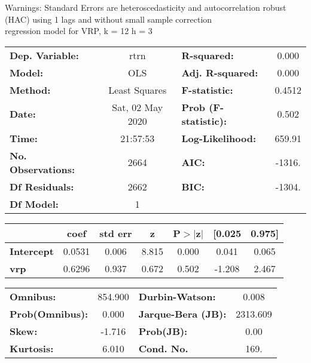 Warnings: \newline
 [1] Standard Errors are heteroscedasticity and autocorrelation robust (HAC) using 1 lags and without small sample correction\\ 

regression model for VRP, k = 12 h = 3\begin{center}
\begin{tabular}{lclc}
\toprule
\textbf{Dep. Variable:}    &       rtrn       & \textbf{  R-squared:         } &     0.000   \\
\textbf{Model:}            &       OLS        & \textbf{  Adj. R-squared:    } &     0.000   \\
\textbf{Method:}           &  Least Squares   & \textbf{  F-statistic:       } &    0.4512   \\
\textbf{Date:}             & Sat, 02 May 2020 & \textbf{  Prob (F-statistic):} &    0.502    \\
\textbf{Time:}             &     21:57:53     & \textbf{  Log-Likelihood:    } &    659.91   \\
\textbf{No. Observations:} &        2664      & \textbf{  AIC:               } &    -1316.   \\
\textbf{Df Residuals:}     &        2662      & \textbf{  BIC:               } &    -1304.   \\
\textbf{Df Model:}         &           1      & \textbf{                     } &             \\
\bottomrule
\end{tabular}
\begin{tabular}{lcccccc}
                   & \textbf{coef} & \textbf{std err} & \textbf{z} & \textbf{P$> |$z$|$} & \textbf{[0.025} & \textbf{0.975]}  \\
\midrule
\textbf{Intercept} &       0.0531  &        0.006     &     8.815  &         0.000        &        0.041    &        0.065     \\
\textbf{vrp}       &       0.6296  &        0.937     &     0.672  &         0.502        &       -1.208    &        2.467     \\
\bottomrule
\end{tabular}
\begin{tabular}{lclc}
\textbf{Omnibus:}       & 854.900 & \textbf{  Durbin-Watson:     } &    0.008  \\
\textbf{Prob(Omnibus):} &   0.000 & \textbf{  Jarque-Bera (JB):  } & 2313.609  \\
\textbf{Skew:}          &  -1.716 & \textbf{  Prob(JB):          } &     0.00  \\
\textbf{Kurtosis:}      &   6.010 & \textbf{  Cond. No.          } &     169.  \\
\bottomrule
\end{tabular}
\end{center}

